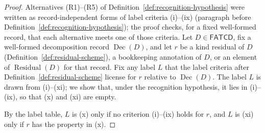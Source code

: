 \documentclass[11pt]{article}
\theoremstyle{definition}
\newcommand{\FATCD}{\ensuremath{\mathsf{FATCD}}}
\newcommand{\Dec}[1]{\ensuremath{\operatorname{Dec}\!\left(#1\right)}}
\newcommand{\Residual}[1]{\ensuremath{\operatorname{Residual}\!\left(#1\right)}}
\begin{document}
\begin{proof}
Alternatives (R1)--(R5) of Definition~\ref{def:recognition-hypothesis} were
written as record-independent forms of label criteria (i)--(ix) (paragraph
before Definition~\ref{def:recognition-hypothesis}); the proof checks, for a
fixed well-formed record, that each alternative meets one of those criteria.
Let \(D\in\FATCD{}\), fix a well-formed decomposition record
\(\Dec{D}\), and let \(r\) be a kind residual of \(D\)
(Definition~\ref{def:residual-scheme}), a bookkeeping annotation of \(D\), or an element of
\(\Residual{D}\) for that record. Fix any label
\(L\) that the label criteria after Definition~\ref{def:residual-scheme}
license for \(r\) relative to \(\Dec{D}\). The label \(L\) is drawn from
(i)--(xi); we show that, under the recognition hypothesis, it lies in
(i)--(ix), so that (x) and (xi) are empty.

By the label table, \(L\) is (x) only if no criterion (i)--(ix) holds for
\(r\), and \(L\) is (xi) only if \(r\) has the property in (x).


\end{proof}
\end{document}
